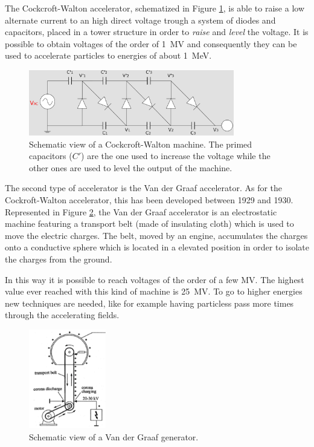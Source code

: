 The Cockcroft-Walton accelerator, schematized in Figure \ref{fig:Cockcroft-Walton}, is able to raise a low  alternate current to an high direct voltage trough a system of diodes and capacitors, placed in a tower structure in order to \textit{raise} and \textit{level} the voltage. It is possible to obtain voltages of the order of \SI{1}{MV} and consequently they can be used to accelerate particles to energies of about \SI{1}{MeV}.

\begin{figure}
    \centering
    \includegraphics[width=0.8\textwidth]{Figures/Cockcroft-Walton}
    \caption{Schematic view of a Cockcroft-Walton machine. The primed capacitors ($C'$) are the one used to increase the voltage while the other ones are used to level the output of the machine.}
    \label{fig:Cockcroft-Walton}
\end{figure}

The second type of accelerator is the Van der Graaf accelerator. As for the Cockroft-Walton accelerator, this has been developed between 1929 and 1930. Represented in Figure \ref{fig:Van-der-Graaf}, the Van der Graaf accelerator is an electrostatic machine featuring a transport belt (made of insulating cloth) which is used to move the electric charges. The belt, moved by an engine, accumulates the charges onto a conductive sphere which is located in a elevated position in order to isolate the charges from the ground.

In this way it is possible to reach voltages of the order of a few \si{MV}. The highest value ever reached with this kind of machine is \SI{25}{MV}. To go to higher energies new techniques are needed, like for example having particless pass more times through the accelerating fields.

\begin{figure}
    \centering
    \includegraphics[width=0.3\textwidth]{Figures/Van-der-Graaf}
    \caption{Schematic view of a Van der Graaf generator.}
    \label{fig:Van-der-Graaf}
\end{figure}

